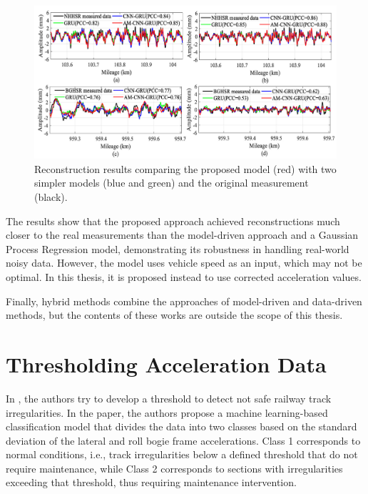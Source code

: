 \begin{figure}[H]
    \centering
    \includegraphics[width=12cm]{Cap2_LitReview/Track_Quality_Accel/Hao (2023)/Hao_results.png}
    \caption{Reconstruction results comparing the proposed model (red) with two simpler models (blue and green) and the original measurement (black). \cite{Hao02012023}}
    \label{fig:Hao_Results}
\end{figure}

The results show that the proposed approach achieved reconstructions much closer to the real measurements than the model-driven approach and a Gaussian Process Regression model, demonstrating its robustness in handling real-world noisy data. However, the model uses vehicle speed as an input, which may not be optimal. In this thesis, it is proposed instead to use corrected acceleration values.

Finally, hybrid methods combine the approaches of model-driven and data-driven methods, but the contents of these works are outside the scope of this thesis.

\section{Thresholding Acceleration Data} \label{sec-thresholding-acceleration}

In \cite{DeRosa2021}, the authors try to develop a threshold to detect not safe railway track irregularities. In the paper, the authors propose a machine learning-based classification model that divides the data into two classes based on the standard deviation of the lateral and roll bogie frame accelerations. Class 1 corresponds to normal conditions, i.e., track irregularities below a defined threshold that do not require maintenance, while Class 2 corresponds to sections with irregularities exceeding that threshold, thus requiring maintenance intervention. 

